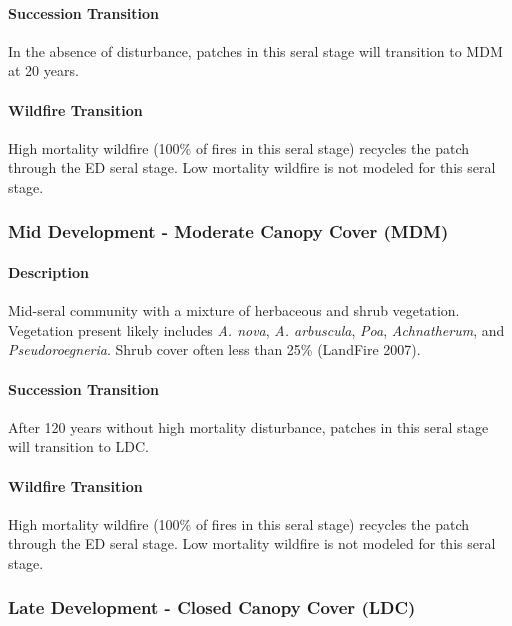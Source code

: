 \paragraph{Succession Transition} In the absence of disturbance, patches in this seral stage will transition to MDM at 20 years. 

\paragraph{Wildfire Transition} High mortality wildfire (100\% of fires in this seral stage) recycles the patch through the ED seral stage. Low mortality wildfire is not modeled for this seral stage.

\noindent\hrulefill


\subsubsection{Mid Development - Moderate Canopy Cover (MDM)}

\paragraph{Description} Mid-seral community with a mixture of herbaceous and shrub vegetation. Vegetation present likely includes \emph{A. nova}, \emph{A. arbuscula}, \emph{Poa}, \emph{Achnatherum}, and \emph{Pseudoroegneria}.  Shrub cover often less than 25\% (LandFire 2007).

\paragraph{Succession Transition} After 120 years without high mortality disturbance, patches in this seral stage will transition to LDC. 

\paragraph{Wildfire Transition} High mortality wildfire (100\% of fires in this seral stage) recycles the patch through the ED seral stage. Low mortality wildfire is not modeled for this seral stage.

\noindent\hrulefill


\subsubsection{Late Development - Closed Canopy Cover (LDC)} 

